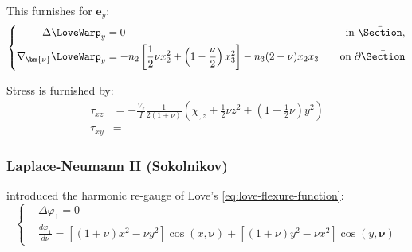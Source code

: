 

This furnishes for \(\mathbf{e}_y\):
\begin{equation*}
\left\{
\begin{aligned}
\Delta \LoveWarp_y &= 0 \quad  &\text{in } \bar{\Section}, \\
\nabla_{\bm{\nu}}\LoveWarp_y &=-n_2\left[\frac{1}{2} \nu x_2^2+\left(1-\frac{\nu}{2}\right) x_3^2\right]-n_3(2+\nu) x_2 x_3
\quad&\text{on } \partial \bar{\Section}
\end{aligned}
\right.
\label{eq:love-flexure-2}
\end{equation*}

Stress is furnished by:
\begin{equation*}
\begin{aligned}
\tau_{xz} &= -\frac{V_z}{I}\frac{1}{2(1+\nu)}\left(
\chi_{,z} + \frac{1}{2}\nu z^2 + (1 - \tfrac{1}{2}\nu) y^2
\right) \\
\tau_{xy} &=
\end{aligned}
\end{equation*}
%

\subsubsection{Laplace-Neumann II (Sokolnikov)}
\cite{sokolnikoffMathematicalTheoryElasticity1946} introduced the harmonic re-gauge of Love's \eqref{eq:love-flexure-function}:
\begin{equation}
\left\{
\begin{aligned} 
& \Delta \varphi_1 = 0\\
& \frac{d \varphi_1}{d \nu}=\left[(1+\nu) x^2-\nu y^2\right] \cos (x, \bm{\nu}) 
+\left[(1+\nu) y^2-\nu x^2\right] \cos (y, \bm{\nu})
\end{aligned}
\right.
\end{equation}


